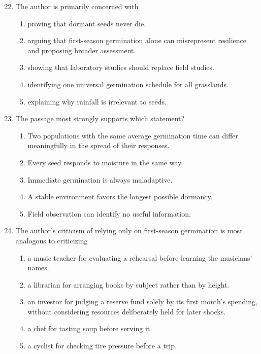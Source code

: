 \begin{enumerate}
\setcounter{enumi}{21}

\item The author is primarily concerned with
\begin{enumerate}
\item[(A)] proving that dormant seeds never die.
\item[(B)] arguing that first-season germination alone can misrepresent resilience and proposing broader assessment.
\item[(C)] showing that laboratory studies should replace field studies.
\item[(D)] identifying one universal germination schedule for all grasslands.
\item[(E)] explaining why rainfall is irrelevant to seeds.
\end{enumerate}

\item The passage most strongly supports which statement?
\begin{enumerate}
\item[(A)] Two populations with the same average germination time can differ meaningfully in the spread of their responses.
\item[(B)] Every seed responds to moisture in the same way.
\item[(C)] Immediate germination is always maladaptive.
\item[(D)] A stable environment favors the longest possible dormancy.
\item[(E)] Field observation can identify no useful information.
\end{enumerate}

\item The author's criticism of relying only on first-season germination is most analogous to criticizing
\begin{enumerate}
\item[(A)] a music teacher for evaluating a rehearsal before learning the musicians' names.
\item[(B)] a librarian for arranging books by subject rather than by height.
\item[(C)] an investor for judging a reserve fund solely by its first month's spending, without considering resources deliberately held for later shocks.
\item[(D)] a chef for tasting soup before serving it.
\item[(E)] a cyclist for checking tire pressure before a trip.
\end{enumerate}


\end{enumerate}
